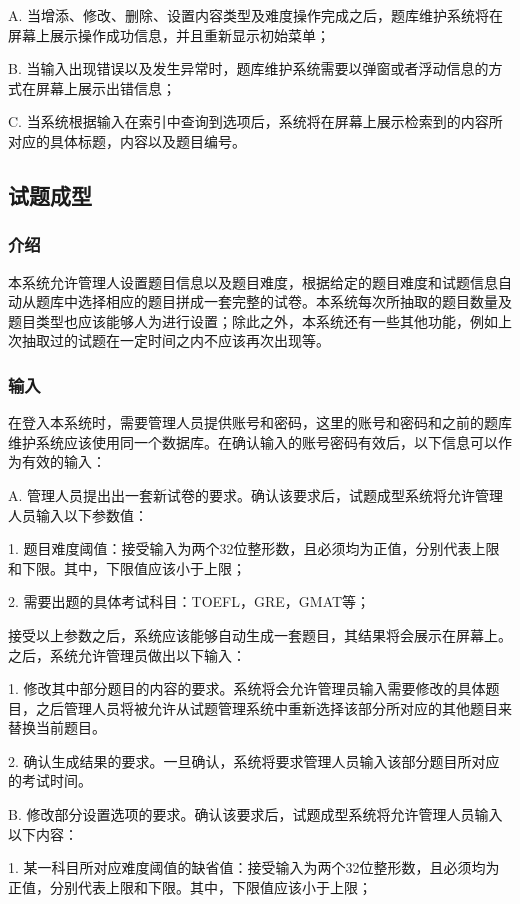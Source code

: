 A. 当增添、修改、删除、设置内容类型及难度操作完成之后，题库维护系统将在屏幕上展示操作成功信息，并且重新显示初始菜单；

B. 当输入出现错误以及发生异常时，题库维护系统需要以弹窗或者浮动信息的方式在屏幕上展示出错信息；

C. 当系统根据输入在索引中查询到选项后，系统将在屏幕上展示检索到的内容所对应的具体标题，内容以及题目编号。


\subsection{试题成型}

\subsubsection{介绍}
本系统允许管理人设置题目信息以及题目难度，根据给定的题目难度和试题信息自动从题库中选择相应的题目拼成一套完整的试卷。本系统每次所抽取的题目数量及题目类型也应该能够人为进行设置；除此之外，本系统还有一些其他功能，例如上次抽取过的试题在一定时间之内不应该再次出现等。

\subsubsection{输入}
在登入本系统时，需要管理人员提供账号和密码，这里的账号和密码和之前的题库维护系统应该使用同一个数据库。在确认输入的账号密码有效后，以下信息可以作为有效的输入：

A. 管理人员提出出一套新试卷的要求。确认该要求后，试题成型系统将允许管理人员输入以下参数值：

	1. 题目难度阈值：接受输入为两个32位整形数，且必须均为正值，分别代表上限和下限。其中，下限值应该小于上限；

	2. 需要出题的具体考试科目：TOEFL，GRE，GMAT等；

	接受以上参数之后，系统应该能够自动生成一套题目，其结果将会展示在屏幕上。之后，系统允许管理员做出以下输入：

	1. 修改其中部分题目的内容的要求。系统将会允许管理员输入需要修改的具体题目，之后管理人员将被允许从试题管理系统中重新选择该部分所对应的其他题目来替换当前题目。

	2. 确认生成结果的要求。一旦确认，系统将要求管理人员输入该部分题目所对应的考试时间。

B. 修改部分设置选项的要求。确认该要求后，试题成型系统将允许管理人员输入以下内容：

	1. 某一科目所对应难度阈值的缺省值：接受输入为两个32位整形数，且必须均为正值，分别代表上限和下限。其中，下限值应该小于上限；

